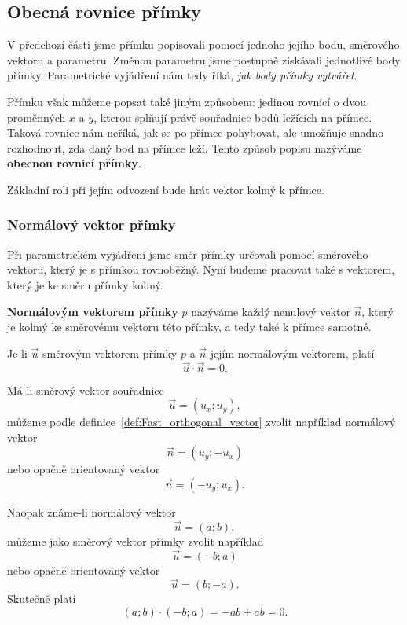 \subsection{Obecná rovnice přímky}
\label{subsec:General_line_equation}

V předchozí části jsme přímku popisovali pomocí jednoho jejího bodu,
směrového vektoru a parametru. Změnou parametru jsme postupně získávali
jednotlivé body přímky. Parametrické vyjádření nám tedy říká,
\emph{jak body přímky vytvářet}.

Přímku však můžeme popsat také jiným způsobem: jedinou rovnicí o dvou
proměnných $x$ a $y$, kterou splňují právě souřadnice bodů ležících na
přímce. Taková rovnice nám neříká, jak se po přímce pohybovat, ale
umožňuje snadno rozhodnout, zda daný bod na přímce leží. Tento způsob
popisu nazýváme \textbf{obecnou rovnicí přímky}.

Základní roli při jejím odvození bude hrát vektor kolmý k přímce.

\subsubsection{Normálový vektor přímky}
\label{subsubsec:Normal_vector_line}

Při parametrickém vyjádření jsme směr přímky určovali pomocí směrového
vektoru, který je s přímkou rovnoběžný. Nyní budeme pracovat také
s vektorem, který je ke směru přímky kolmý.

\begin{definition}\label{def:Normal_vector_line}
    \textbf{Normálovým vektorem přímky} $p$ nazýváme každý nenulový
    vektor $\vec{n}$, který je kolmý ke směrovému vektoru této přímky,
    a tedy také k přímce samotné.
\end{definition}

Je-li $\vec{u}$ směrovým vektorem přímky $p$ a $\vec{n}$ jejím
normálovým vektorem, platí
\begin{equation}\label{eq:Direction_normal_dot_product}
    \vec{u}\cdot\vec{n}=0.
\end{equation}

Má-li směrový vektor souřadnice
\[
    \vec{u}=(u_x;u_y),
\]
můžeme podle definice~\ref{def:Fast_orthogonal_vector} zvolit například
normálový vektor
\[
    \vec{n}=(u_y;-u_x)
\]
nebo opačně orientovaný vektor
\[
    \vec{n}=(-u_y;u_x).
\]

Naopak známe-li normálový vektor
\[
    \vec{n}=(a;b),
\]
můžeme jako směrový vektor přímky zvolit například
\begin{equation}\label{eq:Direction_vector_from_normal_vector}
    \vec{u}=(-b;a)
\end{equation}
nebo opačně orientovaný vektor
\[
    \vec{u}=(b;-a).
\]
Skutečně platí
\[
    (a;b)\cdot(-b;a)=-ab+ab=0.
\]

